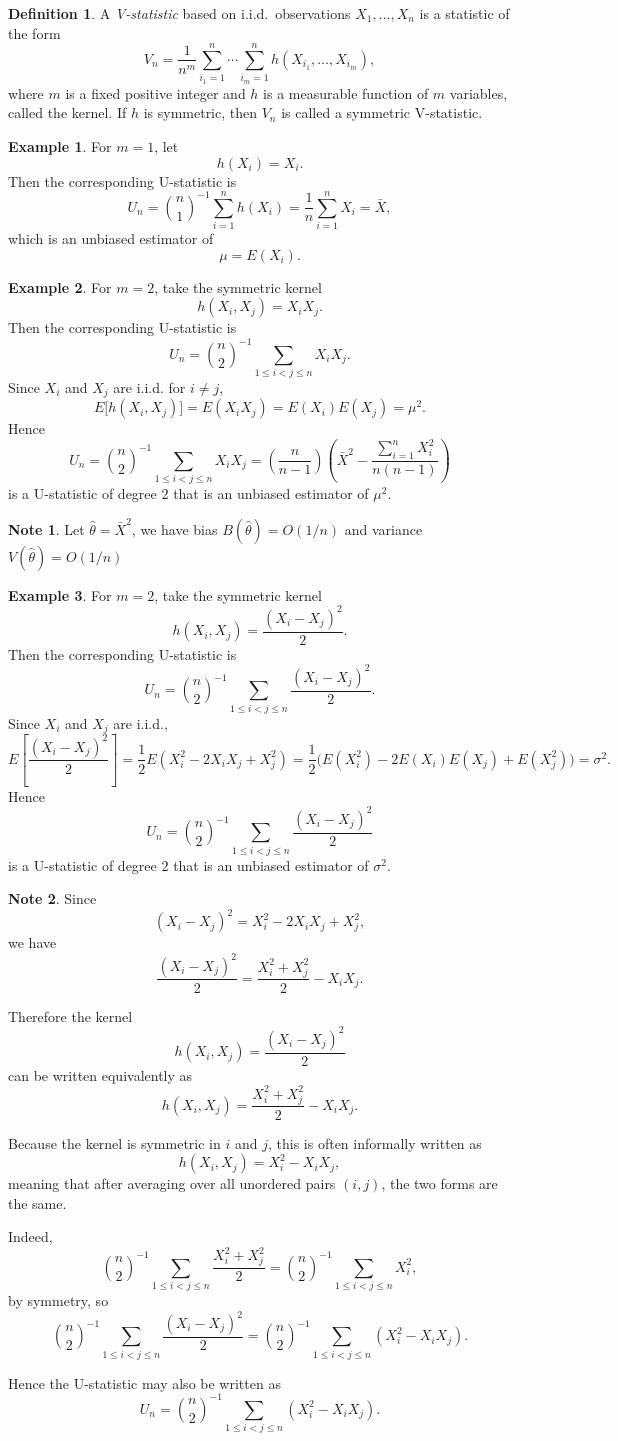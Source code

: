 \documentclass[11pt]{article}
\theoremstyle{definition}
\newtheorem{defn}{Definition}[section]
\newtheorem{note}{Note}[section]
\newtheorem{exmp}{Example}[section]
\begin{document}
\begin{defn}
A \emph{V-statistic} based on i.i.d.\ observations \(X_1,\dots,X_n\) is a statistic of the form
\[
V_n=\frac{1}{n^m}\sum_{i_1=1}^n \cdots \sum_{i_m=1}^n h(X_{i_1},\dots,X_{i_m}),
\]
where \(m\) is a fixed positive integer and \(h\) is a measurable function of \(m\) variables, called the kernel. If \(h\) is symmetric, then \(V_n\) is called a symmetric V-statistic.
\end{defn}
\begin{exmp}
    For \(m=1\), let
\[
h(X_i)=X_i.
\]
Then the corresponding U-statistic is
\[
U_n=\binom{n}{1}^{-1}\sum_{i=1}^n h(X_i)
=\frac{1}{n}\sum_{i=1}^n X_i
=\bar X,
\]
which is an unbiased estimator of
\[
\mu=E(X_i).
\]
\end{exmp}
\begin{exmp}
    For \(m=2\), take the symmetric kernel
\[
h(X_i,X_j)=X_iX_j.
\]
Then the corresponding U-statistic is
\[
U_n=\binom{n}{2}^{-1}\sum_{1\le i<j\le n} X_iX_j.
\]
Since \(X_i\) and \(X_j\) are i.i.d. for \(i\ne j\),
\[
E\bigl[h(X_i,X_j)\bigr]=E(X_iX_j)=E(X_i)E(X_j)=\mu^2.
\]
Hence
\[
U_n=\binom{n}{2}^{-1}\sum_{1\le i<j\le n} X_iX_j = (\frac{n}{n-1})(\bar{X}^2-\frac{\sum_{i=1}^n X_i^2}{n(n-1)})
\]
is a U-statistic of degree \(2\) that is an unbiased estimator of \(\mu^2\).
\end{exmp}
\begin{note}
    Let $\hat\theta = \bar{X}^2$, we have bias $B(\hat\theta) = O(1/n)$ and variance $V(\hat\theta) = O(1/n)$ 
\end{note}
\begin{exmp}
    For \(m=2\), take the symmetric kernel
\[
h(X_i,X_j)=\frac{(X_i-X_j)^2}{2}.
\]
Then the corresponding U-statistic is
\[
U_n=\binom{n}{2}^{-1}\sum_{1\le i<j\le n}\frac{(X_i-X_j)^2}{2}.
\]
Since \(X_i\) and \(X_j\) are i.i.d.,
\[
E\left[\frac{(X_i-X_j)^2}{2}\right]
=\frac{1}{2}E\left(X_i^2-2X_iX_j+X_j^2\right)
=\frac{1}{2}\bigl(E(X_i^2)-2E(X_i)E(X_j)+E(X_j^2)\bigr)
=\sigma^2.
\]
Hence
\[
U_n=\binom{n}{2}^{-1}\sum_{1\le i<j\le n}\frac{(X_i-X_j)^2}{2}
\]
is a U-statistic of degree \(2\) that is an unbiased estimator of \(\sigma^2\).
\end{exmp}
\begin{note}
    Since
\[
(X_i-X_j)^2=X_i^2-2X_iX_j+X_j^2,
\]
we have
\[
\frac{(X_i-X_j)^2}{2}
=\frac{X_i^2+X_j^2}{2}-X_iX_j.
\]

Therefore the kernel
\[
h(X_i,X_j)=\frac{(X_i-X_j)^2}{2}
\]
can be written equivalently as
\[
h(X_i,X_j)=\frac{X_i^2+X_j^2}{2}-X_iX_j.
\]

Because the kernel is symmetric in \(i\) and \(j\), this is often informally written as
\[
h(X_i,X_j)=X_i^2-X_iX_j,
\]
meaning that after averaging over all unordered pairs \((i,j)\), the two forms are the same.

Indeed,
\[
\binom{n}{2}^{-1}\sum_{1\le i<j\le n}\frac{X_i^2+X_j^2}{2}
=
\binom{n}{2}^{-1}\sum_{1\le i<j\le n} X_i^2,
\]
by symmetry, so
\[
\binom{n}{2}^{-1}\sum_{1\le i<j\le n}\frac{(X_i-X_j)^2}{2}
=
\binom{n}{2}^{-1}\sum_{1\le i<j\le n}(X_i^2-X_iX_j).
\]

Hence the U-statistic may also be written as
\[
U_n
=
\binom{n}{2}^{-1}\sum_{1\le i<j\le n}(X_i^2-X_iX_j).
\]
\end{note}
\end{document}
